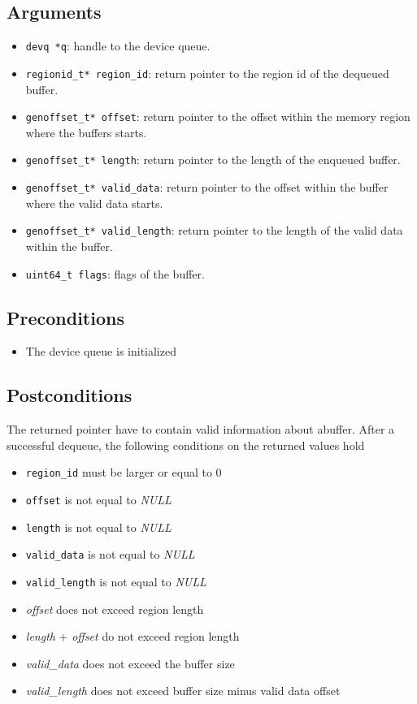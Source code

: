 \documentclass[a4paper,11pt,twoside]{report}
\begin{document}
{{	\subsection*{Arguments}
	\begin{itemize}
		\item \texttt{devq *q}: handle to the device queue.
		\item \texttt{regionid\_t* region\_id}: return pointer to the region id of the dequeued buffer.
		\item \texttt{genoffset\_t* offset}: return pointer to the offset within the memory region where the buffers starts. 
		\item \texttt{genoffset\_t* length}: return pointer to the length of the enqueued buffer.
		\item \texttt{genoffset\_t* valid\_data}: return pointer to the offset within the buffer where the valid data starts.
		\item \texttt{genoffset\_t* valid\_length}: return pointer to the length of the valid data within the buffer.
		\item \texttt{uint64\_t flags}: flags of the buffer. 
	\end{itemize}
	\subsection*{Preconditions}
	\begin{itemize}
		\item The device queue is initialized
		
	\end{itemize}
	\subsection*{Postconditions}
	The returned pointer have to contain valid information about abuffer.
	After a successful dequeue, the following conditions on the returned values hold
	\begin{itemize}
		\item \texttt{region\_id} must be larger or equal to 0
		\item \texttt{offset} is not equal to \textit{NULL}
		\item \texttt{length} is not equal to \textit{NULL}
		\item \texttt{valid\_data} is not equal to \textit{NULL}
		\item \texttt{valid\_length} is not equal to \textit{NULL}
		\item \textit{offset} does not exceed region length
		\item \textit{length} + \textit{offset} do not exceed region length
		\item \textit{valid\_data} does not exceed the buffer size
		\item \textit{valid\_length} does not exceed buffer size minus valid data offset
	\end{itemize}
	
}}
\end{document}
